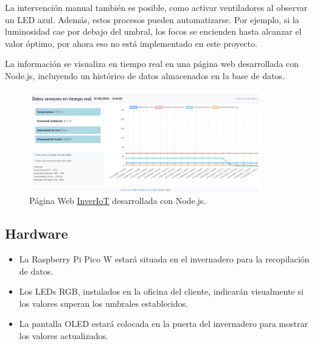 La intervención manual también es posible, como activar ventiladores al observar un LED azul. Además, estos procesos pueden automatizarse. Por ejemplo, si la luminosidad cae por debajo del umbral, los focos se encienden hasta alcanzar el valor óptimo, por ahora eso no está implementado en este proyecto.

La información se visualiza en tiempo real en una página web desarrollada con Node.js, incluyendo un histórico de datos almacenados en la base de datos.

\begin{figure}[h]
	\centering
	\includegraphics[width=0.9\textwidth]{img/desarrollo/Dashboard3.png}
	\caption{Página Web \href{http://www.inveriot.com}{InverIoT} desarrollada con Node.js.}
\end{figure}


\subsection{Hardware}\label{proyecto:Hardware}
\begin{itemize}
	\item La Raspberry Pi Pico W estará situada en el invernadero para la recopilación de datos.
	\item Los LEDs RGB, instalados en la oficina del cliente, indicarán visualmente si los valores superan los umbrales establecidos.
	\item La pantalla OLED estará colocada en la puerta del invernadero para mostrar los valores actualizados.
\end{itemize}

